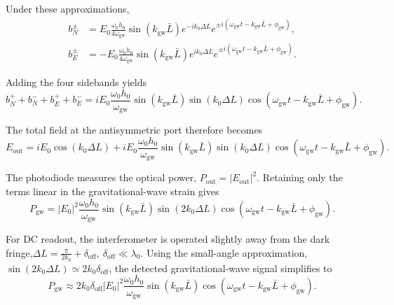 \documentclass{report}
\begin{document}
Under these approximations,
\begin{align}
b_N^{\pm}
&=
E_0
\frac{\omega_0h_0}{4\omega_{\mathrm{gw}}}
\sin(k_{\mathrm{gw}}\bar L)
e^{-ik_0\Delta L}
e^{\pm i(\omega_{\mathrm{gw}}t-k_{\mathrm{gw}}\bar L+\phi_{\mathrm{gw}})},
\\
b_E^{\pm}
&=
-
E_0
\frac{\omega_0h_0}{4\omega_{\mathrm{gw}}}
\sin(k_{\mathrm{gw}}\bar L)
e^{ik_0\Delta L}
e^{\pm i(\omega_{\mathrm{gw}}t-k_{\mathrm{gw}}\bar L+\phi_{\mathrm{gw}})}.
\end{align}

Adding the four sidebands yields
\begin{equation}
b_N^{+}+b_N^{-}+b_E^{+}+b_E^{-}
=
iE_0
\frac{\omega_0h_0}{\omega_{\mathrm{gw}}}
\sin(k_{\mathrm{gw}}\bar L)
\sin(k_0\Delta L)
\cos\!\left(
\omega_{\mathrm{gw}}t-k_{\mathrm{gw}}\bar L+\phi_{\mathrm{gw}}
\right).
\end{equation}

The total field at the antisymmetric port therefore becomes
\begin{equation}
\boxed{
E_{\mathrm{out}}
=
iE_0\cos(k_0\Delta L)
+
iE_0
\frac{\omega_0h_0}{\omega_{\mathrm{gw}}}
\sin(k_{\mathrm{gw}}\bar L)
\sin(k_0\Delta L)
\cos\!\left(
\omega_{\mathrm{gw}}t-k_{\mathrm{gw}}\bar L+\phi_{\mathrm{gw}}
\right)}.
\end{equation}

The photodiode measures the optical power, $P_{\mathrm{out}}=|E_{\mathrm{out}}|^2$. Retaining only the terms linear in the gravitational-wave strain gives
\begin{equation}
P_{\mathrm{gw}}
=
|E_0|^2
\frac{\omega_0h_0}{\omega_{\mathrm{gw}}}
\sin(k_{\mathrm{gw}}\bar L)
\sin(2k_0\Delta L)
\cos\!\left(
\omega_{\mathrm{gw}}t-k_{\mathrm{gw}}\bar L+\phi_{\mathrm{gw}}
\right).
\end{equation}

For DC readout, the interferometer is operated slightly away from the dark fringe,$
\Delta L=\frac{\pi}{2k_0}+\delta_{\mathrm{off}},\
\delta_{\mathrm{off}}\ll\lambda_0.
$ Using the small-angle approximation,
$\sin(2k_0\Delta L)
\simeq
2k_0\delta_{\mathrm{off}}$, the detected gravitational-wave signal simplifies to
\begin{equation}
P_{\mathrm{gw}}
\approx
2k_0\delta_{\mathrm{off}}
|E_0|^2
\frac{\omega_0h_0}{\omega_{\mathrm{gw}}}
\sin(k_{\mathrm{gw}}\bar L)
\cos\!\left(
\omega_{\mathrm{gw}}t-k_{\mathrm{gw}}\bar L+\phi_{\mathrm{gw}}
\right).
\end{equation}
\end{document}
